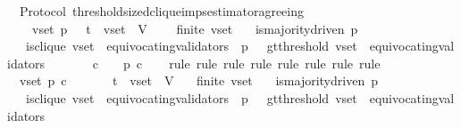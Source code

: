 \begin{isabellebody}
\isamarkupfalse%
%
\endisatagproof
{\isafoldproof}%
%
\isadelimproof
\isanewline
%
\endisadelimproof
\isanewline
\isanewline
{}\isamarkupfalse%
\ {\isacharparenleft}\ Protocol{\isacharparenright}\ threshold{\isacharunderscore}sized{\isacharunderscore}clique{\isacharunderscore}imps{\isacharunderscore}estimator{\isacharunderscore}agreeing\ {\isacharcolon}\isanewline
\ \ {\isachardoublequoteopen}{\isasymforall}\ {\isasymsigma}\ v{\isacharunderscore}set\ p{\isachardot}\ {\isasymsigma}\ {\isasymin}\ {\isasymSigma}t\ {\isasymand}\ v{\isacharunderscore}set\ {\isasymsubseteq}\ V\ \isanewline
\ \ {\isasymlongrightarrow}\ finite\ v{\isacharunderscore}set\isanewline
\ \ {\isasymlongrightarrow}\ is{\isacharunderscore}majority{\isacharunderscore}driven\ p\isanewline
\ \ {\isasymlongrightarrow}\ is{\isacharunderscore}clique\ {\isacharparenleft}v{\isacharunderscore}set\ {\isacharminus}\ equivocating{\isacharunderscore}validators\ {\isasymsigma}{\isacharcomma}\ p{\isacharcomma}\ {\isasymsigma}{\isacharparenright}\ {\isasymand}\ gt{\isacharunderscore}threshold\ {\isacharparenleft}v{\isacharunderscore}set\ {\isacharminus}\ equivocating{\isacharunderscore}validators\ {\isasymsigma}{\isacharcomma}\ {\isasymsigma}{\isacharparenright}\ \isanewline
\ \ {\isasymlongrightarrow}\ {\isacharparenleft}{\isasymforall}\ c\ {\isasymin}\ {\isasymepsilon}\ {\isasymsigma}{\isachardot}\ p\ c{\isacharparenright}{\isachardoublequoteclose}\isanewline
%
\isadelimproof
\ \ %
\endisadelimproof
%
\isatagproof
{}\isamarkupfalse%
\ {\isacharparenleft}rule{\isacharcomma}\ rule{\isacharcomma}\ rule{\isacharcomma}\ rule{\isacharcomma}\ rule{\isacharcomma}\ rule{\isacharcomma}\ rule{\isacharcomma}\ rule{\isacharparenright}\isanewline
{}\isamarkupfalse%
\ {\isacharminus}\isanewline
\ \ \isamarkupfalse%
\ {\isasymsigma}\ v{\isacharunderscore}set\ p\ c\isanewline
\ \ \isamarkupfalse%
\ \ {\isachardoublequoteopen}{\isasymsigma}\ {\isasymin}\ {\isasymSigma}t\ {\isasymand}\ v{\isacharunderscore}set\ {\isasymsubseteq}\ V{\isachardoublequoteclose}\isanewline
\ \ \ {\isachardoublequoteopen}finite\ v{\isacharunderscore}set{\isachardoublequoteclose}\isanewline
\ \ \ {\isachardoublequoteopen}is{\isacharunderscore}majority{\isacharunderscore}driven\ p{\isachardoublequoteclose}\isanewline
\ \ \ {\isachardoublequoteopen}is{\isacharunderscore}clique\ {\isacharparenleft}v{\isacharunderscore}set\ {\isacharminus}\ equivocating{\isacharunderscore}validators\ {\isasymsigma}{\isacharcomma}\ p{\isacharcomma}\ {\isasymsigma}{\isacharparenright}\ {\isasymand}\ gt{\isacharunderscore}threshold\ {\isacharparenleft}v{\isacharunderscore}set\ {\isacharminus}\ equivocating{\isacharunderscore}validators\ {\isasymsigma}{\isacharcomma}\ {\isasymsigma}{\isacharparenright}{\isachardoublequoteclose}\isanewline

\end{isabellebody}
